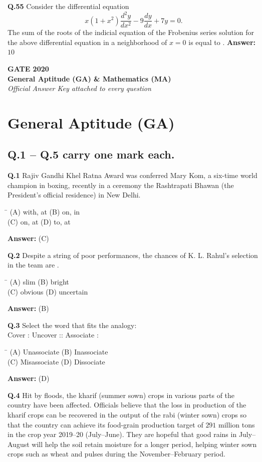 \documentclass[11pt,a4paper]{article}
\newcommand{\optsfourA}[4]{%
  \begin{tabbing}
    \hspace{0.48\linewidth}\=\kill
    (A) #1 \> (B) #2 \\[2pt]
    (C) #3 \> (D) #4
  \end{tabbing}%
}
\newcommand{\ans}[1]{\textbf{Answer:} #1\par\medskip}
\begin{document}
\textbf{Q.55} Consider the differential equation
\[
  x(1 + x^2)\frac{d^2 y}{dx^2} - 9\frac{dy}{dx} + 7y = 0.
\]
The sum of the roots of the indicial equation of the Frobenius series solution for the above differential equation in a neighborhood of $x = 0$ is equal to \underline{\hspace{2cm}}.
\ans{$10$}

\newpage


\begin{center}
  {\LARGE\bfseries GATE 2020}\\[4pt]
  {\large\bfseries General Aptitude (GA) \& Mathematics (MA)}\\[2pt]
  {\small\itshape Official Answer Key attached to every question}
\end{center}
\medskip

\section*{General Aptitude (GA)}

\subsection*{Q.1 -- Q.5 carry one mark each.}

\textbf{Q.1} Rajiv Gandhi Khel Ratna Award was conferred \underline{\hspace{1.8cm}} Mary Kom, a six-time world champion in boxing, recently in a ceremony \underline{\hspace{1.8cm}} the Rashtrapati Bhawan (the President's official residence) in New Delhi.
\optsfourA{with, at}{on, in}{on, at}{to, at}
\ans{(C)}

\textbf{Q.2} Despite a string of poor performances, the chances of K. L. Rahul's selection in the team are \underline{\hspace{2cm}}.
\optsfourA{slim}{bright}{obvious}{uncertain}
\ans{(B)}

\textbf{Q.3} Select the word that fits the analogy:\\
Cover : Uncover :: Associate : \underline{\hspace{2cm}}
\optsfourA{Unassociate}{Inassociate}{Misassociate}{Dissociate}
\ans{(D)}

\textbf{Q.4} Hit by floods, the kharif (summer sown) crops in various parts of the country have been affected. Officials believe that the loss in production of the kharif crops can be recovered in the output of the rabi (winter sown) crops so that the country can achieve its food-grain production target of $291$ million tons in the crop year 2019--20 (July--June). They are hopeful that good rains in July--August will help the soil retain moisture for a longer period, helping winter sown crops such as wheat and pulses during the November--February period.
\end{document}
